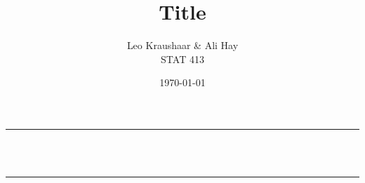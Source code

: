 \documentclass[12pt]{article}
\title{Title}
\author{Leo Kraushaar \& Ali Hay \\ STAT 413}
\date{\today}
\begin{document}
\onehalfspacing

\begin{titlepage}
  \newcommand{\HRule}{\rule{\linewidth}{0.5mm}}
  \center

  \HRule \\[1cm]
  { \huge \bfseries \thetitle}\\[0.4cm]
  \HRule \\[1.8cm]

  \Large \thedate\\[5cm]

  \begin{minipage}{1\textwidth}
    \vspace{10cm}
    \begin{flushleft} \large
      \theauthor
    \end{flushleft}

  \end{minipage}
\end{titlepage}

\newpage
\end{document}
